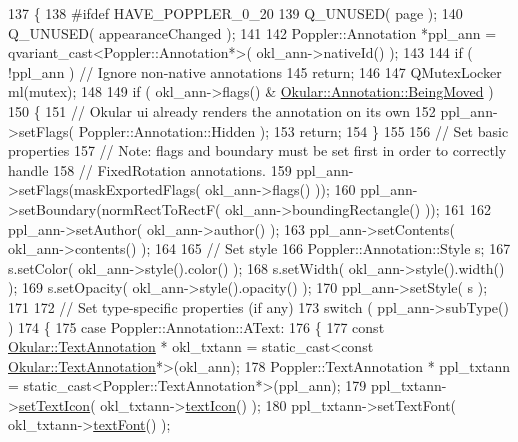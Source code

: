 \begin{DoxyCode}
137 \{
138 \textcolor{preprocessor}{#ifdef HAVE\_POPPLER\_0\_20}
139     Q\_UNUSED( page );
140     Q\_UNUSED( appearanceChanged );
141 
142     Poppler::Annotation *ppl\_ann = qvariant\_cast<Poppler::Annotation*>( okl\_ann->nativeId() );
143 
144     \textcolor{keywordflow}{if} ( !ppl\_ann ) \textcolor{comment}{// Ignore non-native annotations}
145         \textcolor{keywordflow}{return};
146 
147     QMutexLocker ml(mutex);
148 
149     \textcolor{keywordflow}{if} ( okl\_ann->flags() & \hyperlink{classOkular_1_1Annotation_a8a214541446745761efeda70b3a4302ea9cd51e0fe53aac93798a205e7fb5c04a}{Okular::Annotation::BeingMoved} )
150     \{
151         \textcolor{comment}{// Okular ui already renders the annotation on its own}
152         ppl\_ann->setFlags( Poppler::Annotation::Hidden );
153         \textcolor{keywordflow}{return};
154     \}
155 
156     \textcolor{comment}{// Set basic properties}
157     \textcolor{comment}{// Note: flags and boundary must be set first in order to correctly handle}
158     \textcolor{comment}{// FixedRotation annotations.}
159     ppl\_ann->setFlags(maskExportedFlags( okl\_ann->flags() ));
160     ppl\_ann->setBoundary(normRectToRectF( okl\_ann->boundingRectangle() ));
161 
162     ppl\_ann->setAuthor( okl\_ann->author() );
163     ppl\_ann->setContents( okl\_ann->contents() );
164 
165     \textcolor{comment}{// Set style}
166     Poppler::Annotation::Style s;
167     s.setColor( okl\_ann->style().color() );
168     s.setWidth( okl\_ann->style().width() );
169     s.setOpacity( okl\_ann->style().opacity() );
170     ppl\_ann->setStyle( s );
171 
172     \textcolor{comment}{// Set type-specific properties (if any)}
173     \textcolor{keywordflow}{switch} ( ppl\_ann->subType() )
174     \{
175         \textcolor{keywordflow}{case} Poppler::Annotation::AText:
176         \{
177             \textcolor{keyword}{const} \hyperlink{classOkular_1_1TextAnnotation}{Okular::TextAnnotation} * okl\_txtann = \textcolor{keyword}{static\_cast<}\textcolor{keyword}{const }
      \hyperlink{classOkular_1_1TextAnnotation}{Okular::TextAnnotation}*\textcolor{keyword}{>}(okl\_ann);
178             Poppler::TextAnnotation * ppl\_txtann = \textcolor{keyword}{static\_cast<}Poppler::TextAnnotation*\textcolor{keyword}{>}(ppl\_ann);
179             ppl\_txtann->\hyperlink{classOkular_1_1TextAnnotation_a4fc186a6617f71488283fa6f7dcf8222}{setTextIcon}( okl\_txtann->\hyperlink{classOkular_1_1TextAnnotation_a40844236e2ea8684a6b439c2c3784821}{textIcon}() );
180             ppl\_txtann->setTextFont( okl\_txtann->\hyperlink{classOkular_1_1TextAnnotation_aa48f194058046e70141412a5e85e7199}{textFont}() );

\end{DoxyCode}
